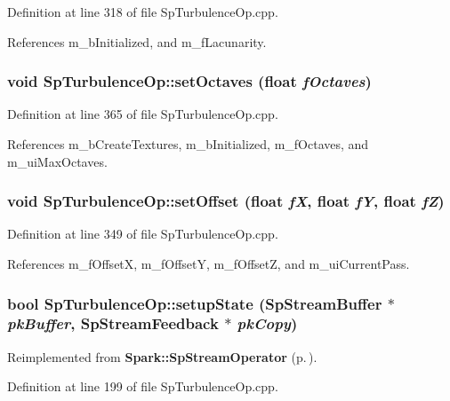 Definition at line 318 of file Sp\-Turbulence\-Op.cpp.

References m\_\-b\-Initialized, and m\_\-f\-Lacunarity.
\subsubsection{\setlength{\rightskip}{0pt plus 5cm}void Sp\-Turbulence\-Op::set\-Octaves (float {\em f\-Octaves})}\label{classSpark_1_1SpTurbulenceOp_a5}


Definition at line 365 of file Sp\-Turbulence\-Op.cpp.

References m\_\-b\-Create\-Textures, m\_\-b\-Initialized, m\_\-f\-Octaves, and m\_\-ui\-Max\-Octaves.
\subsubsection{\setlength{\rightskip}{0pt plus 5cm}void Sp\-Turbulence\-Op::set\-Offset (float {\em f\-X}, float {\em f\-Y}, float {\em f\-Z})\hspace{0.3cm}{\tt  [virtual]}}\label{classSpark_1_1SpTurbulenceOp_a11}


Definition at line 349 of file Sp\-Turbulence\-Op.cpp.

References m\_\-f\-Offset\-X, m\_\-f\-Offset\-Y, m\_\-f\-Offset\-Z, and m\_\-ui\-Current\-Pass.
\subsubsection{\setlength{\rightskip}{0pt plus 5cm}bool Sp\-Turbulence\-Op::setup\-State ({\bf Sp\-Stream\-Buffer} $\ast$ {\em pk\-Buffer}, {\bf Sp\-Stream\-Feedback} $\ast$ {\em pk\-Copy})\hspace{0.3cm}{\tt  [protected, virtual]}}\label{classSpark_1_1SpTurbulenceOp_b1}




Reimplemented from {\bf Spark::Sp\-Stream\-Operator} {\rm (p.\,\pageref{classSpark_1_1SpStreamOperator_b2})}.

Definition at line 199 of file Sp\-Turbulence\-Op.cpp.

